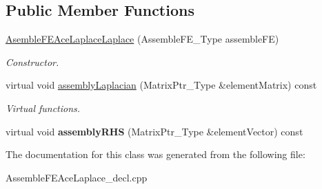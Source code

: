 \subsection*{Public Member Functions}
\begin{DoxyCompactItemize}
\item 
\mbox{\label{classFEDD_1_1AceFeSpecificLaplace_ac356275a99c1bc95e1db8ecd1aaf5502}} 
\hyperlink{classFEDD_1_1AceFeSpecificLaplace_ac356275a99c1bc95e1db8ecd1aaf5502}{Asemble\+F\+E\+Ace\+Laplace\+Laplace} (Assemble\+F\+E\+\_\+\+Type assemble\+FE)
\begin{DoxyCompactList}\small\item\em Constructor. \end{DoxyCompactList}\item 
\mbox{\label{classFEDD_1_1AceFeSpecificLaplace_ac93d4e401a57013cc3c65ce1db70735f}} 
virtual void \hyperlink{classFEDD_1_1AceFeSpecificLaplace_ac93d4e401a57013cc3c65ce1db70735f}{assembly\+Laplacian} (Matrix\+Ptr\+\_\+\+Type \&element\+Matrix) const
\begin{DoxyCompactList}\small\item\em Virtual functions. \end{DoxyCompactList}\item 
\mbox{\label{classFEDD_1_1AceFeSpecificLaplace_a3036d2aaa0f63ad16e4b5ca2a7cd32f5}} 
virtual void {\bfseries assembly\+R\+HS} (Matrix\+Ptr\+\_\+\+Type \&element\+Vector) const
\end{DoxyCompactItemize}


The documentation for this class was generated from the following file\+:\begin{DoxyCompactItemize}
\item 
Assemble\+F\+E\+Ace\+Laplace\+\_\+decl.\+cpp\end{DoxyCompactItemize}
